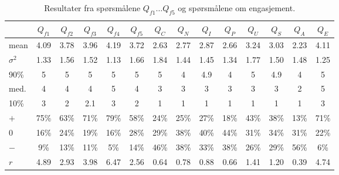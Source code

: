 

\begin{table}
    \caption{Resultater fra spørsmålene \(Q_{f1} \dots Q_{f5}\) og
      spørsmålene om engasjement. }\label{tab:results:2}
\centering\footnotesize

\begin{tabular}{l|ccccc|cccccccc}
      & \(Q_{f1}\) & \(Q_{f2}\) & \(Q_{f3}\) & \(Q_{f4}\) & \(Q_{f5}\) & \(Q_{C}\) & \(Q_{N}\)& \(Q_{I}\)& \(Q_{P}\)& \(Q_{U}\)& \(Q_{S}\) & \(Q_{A}\) & \(Q_{E}\) \\
\hline
mean & 4.09 &	3.78 &	3.96 &	4.19 &	3.72 &	2.63 &	2.77 &	2.87 &
2.66 &	3.24 &	3.03 &	2.23 &	4.11 \\
\(\sigma^2\) & 1.33 &	1.56 &	1.52 &	1.13 &	1.66 &	1.84 &	1.44 &
1.45 &	1.34 &	1.77 &	1.50 &	1.48 &	1.25  \\
\hline
90\% &  5 &	5 &	5 &	5 &	5 &	5 &	4 &	4.9 &	4 &	5 &	4.9 &	4 &	5 \\
med.  &  4 &	4 &	4 &	5 &	4 &	3 &	3 &	3 &	3 &	3 &	3 &	2 &	5 \\
10\% & 3 &	2 &	2.1 &	3 &	2 &	1 &	1 &	1 &	1 &	1 &	1 &	1 &	3 \\
\hline
\(+\)  &  75\%&	63\%&	71\%&	79\%&	58\%&	24\%&	25\%&	27\%&	18\%&	43\%&	38\%&	13\%&	71\%\\
0      &  16\%&	24\%&	19\%&	16\%&	28\%&	29\%&	38\%&	40\%&	44\%&	31\%&	34\%&	31\%&	22\%\\
\(-\)  &   9\%&	13\%&	11\%&	 5\%&	14\%&	46\%&	38\%&	33\%&	38\%&	26\%&	29\%&	56\%&	6\%\\
\hline
\(r\)  & 4.89&	2.93&	3.98&	6.47&	2.56&	0.64\adfarrowse5&	0.78&	0.88&	0.66\adfarrowse5&	1.41\adfarrowne5&	1.20&	0.39\adfarrows5&	4.74\adfarrown5\\

\end{tabular}
\end{table}

